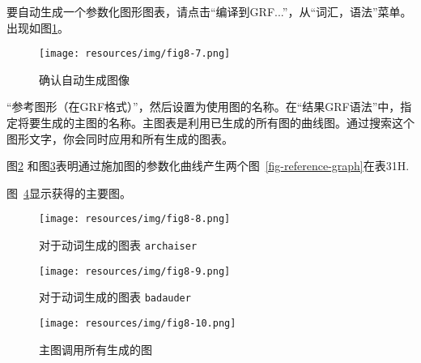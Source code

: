 \bigskip
\noindent  要自动生成一个参数化图形图表，请点击“编译到GRF...”，从“词汇，语法”菜单。出现如图\ref{fig-configuration-graph-generation}。

\begin{figure}[!h]
\begin{center}
\texttt{[image: resources/img/fig8-7.png]}
\caption{确认自动生成图像\label{fig-configuration-graph-generation}}
\end{center}
\end{figure}

\bigskip
{}“参考图形（在GRF格式）”，然后设置为使用图的名称。在“结果GRF语法”中，指定将要生成的主图的名称。主图表是利用已生成的所有图的曲线图。通过搜索这个图形文字，你会同时应用和所有生成的图表。


\bigskip

\bigskip
\noindent 图\ref{fig-archaiser} 和图\ref{fig-badauder}表明通过施加图的参数化曲线产生两个图~\ref{fig-reference-graph}在表31H.

\bigskip
\noindent 图~\ref{fig-main-graph}显示获得的主要图。

\begin{figure}[!h]
\begin{center}
\texttt{[image: resources/img/fig8-8.png]}
\caption{对于动词生成的图表
\texttt{archaiser}\label{fig-archaiser}}
\end{center}
\end{figure}

\begin{figure}[!h]
\begin{center}
\texttt{[image: resources/img/fig8-9.png]}
\caption{对于动词生成的图表 \texttt{badauder}\label{fig-badauder}}
\end{center}
\end{figure}

\begin{figure}[!h]
\begin{center}
\texttt{[image: resources/img/fig8-10.png]}
\caption{主图调用所有生成的图\label{fig-main-graph}}
\end{center}
\end{figure}



